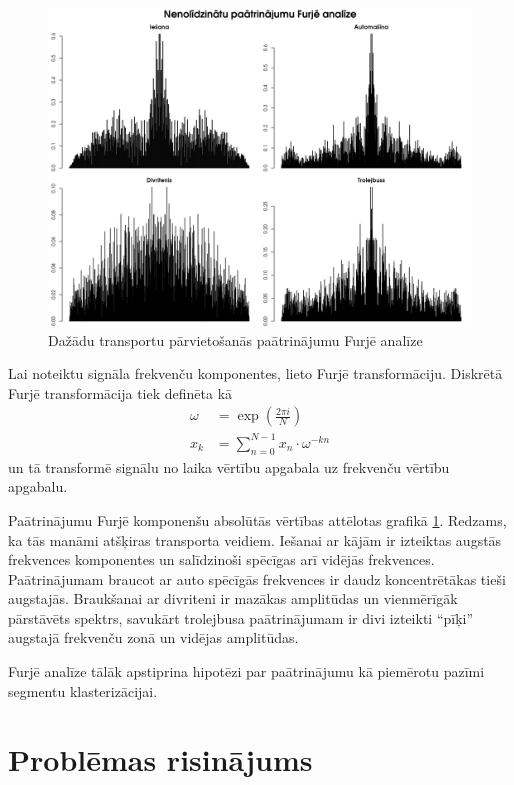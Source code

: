 \documentclass{ludis}
\begin{document}
\begin{figure}
  \centering
  \includegraphics[scale=0.5]{img/fourier_analysis}
  \caption{Dažādu transportu pārvietošanās paātrinājumu Furjē analīze}
  \label{fig:fourier_analysis}
\end{figure}

Lai noteiktu signāla frekvenču komponentes, lieto Furjē transformāciju. Diskrētā Furjē transformācija
tiek definēta kā 
\begin{align*}
  \omega &= \exp \left (\frac{2 \pi i}{N} \right)\\
  x_k &= \sum_{n = 0}^{N - 1} x_n \cdot \omega^{-kn}
\end{align*}
un tā transformē signālu no laika vērtību apgabala uz frekvenču vērtību apgabalu.

Paātrinājumu Furjē komponenšu absolūtās vērtības attēlotas 
grafikā \ref{fig:fourier_analysis}. Redzams, ka tās manāmi atšķiras transporta veidiem. Iešanai ar
kājām ir izteiktas augstās frekvences komponentes un salīdzinoši spēcīgas arī vidējās frekvences.
Paātrinājumam braucot ar auto spēcīgās frekvences ir daudz koncentrētākas tieši augstajās.
Braukšanai ar divriteni ir mazākas amplitūdas un vienmērīgāk pārstāvēts spektrs, savukārt trolejbusa
paātrinājumam ir divi izteikti ``pīķi'' augstajā frekvenču zonā un vidējas amplitūdas.

Furjē analīze tālāk apstiprina hipotēzi par paātrinājumu kā piemērotu pazīmi segmentu 
klasterizācijai. 

\chapter{Problēmas risinājums}
\end{document}
